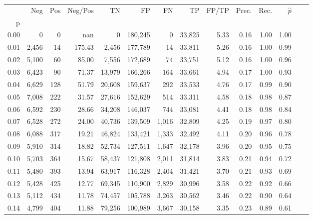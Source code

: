 \begin{tabular}{rrrrrrrrrrrrrr}
\toprule
{} &    Neg &  Pos & Neg/Pos &       TN &       FP &      FN &      TP & FP/TP & Prec. &  Rec. & $\hat{p}$ \\
p    &        &      &         &          &          &         &         &       &       &       &           \\
\midrule
0.00 &      0 &    0 &     nan &        0 &  180,245 &       0 &  33,825 &  5.33 &  0.16 &  1.00 &      1.00 \\
0.01 &  2,456 &   14 &  175.43 &    2,456 &  177,789 &      14 &  33,811 &  5.26 &  0.16 &  1.00 &      0.99 \\
0.02 &  5,100 &   60 &   85.00 &    7,556 &  172,689 &      74 &  33,751 &  5.12 &  0.16 &  1.00 &      0.96 \\
0.03 &  6,423 &   90 &   71.37 &   13,979 &  166,266 &     164 &  33,661 &  4.94 &  0.17 &  1.00 &      0.93 \\
0.04 &  6,629 &  128 &   51.79 &   20,608 &  159,637 &     292 &  33,533 &  4.76 &  0.17 &  0.99 &      0.90 \\
0.05 &  7,008 &  222 &   31.57 &   27,616 &  152,629 &     514 &  33,311 &  4.58 &  0.18 &  0.98 &      0.87 \\
0.06 &  6,592 &  230 &   28.66 &   34,208 &  146,037 &     744 &  33,081 &  4.41 &  0.18 &  0.98 &      0.84 \\
0.07 &  6,528 &  272 &   24.00 &   40,736 &  139,509 &   1,016 &  32,809 &  4.25 &  0.19 &  0.97 &      0.80 \\
0.08 &  6,088 &  317 &   19.21 &   46,824 &  133,421 &   1,333 &  32,492 &  4.11 &  0.20 &  0.96 &      0.78 \\
0.09 &  5,910 &  314 &   18.82 &   52,734 &  127,511 &   1,647 &  32,178 &  3.96 &  0.20 &  0.95 &      0.75 \\
0.10 &  5,703 &  364 &   15.67 &   58,437 &  121,808 &   2,011 &  31,814 &  3.83 &  0.21 &  0.94 &      0.72 \\
0.11 &  5,480 &  393 &   13.94 &   63,917 &  116,328 &   2,404 &  31,421 &  3.70 &  0.21 &  0.93 &      0.69 \\
0.12 &  5,428 &  425 &   12.77 &   69,345 &  110,900 &   2,829 &  30,996 &  3.58 &  0.22 &  0.92 &      0.66 \\
0.13 &  5,112 &  434 &   11.78 &   74,457 &  105,788 &   3,263 &  30,562 &  3.46 &  0.22 &  0.90 &      0.64 \\
0.14 &  4,799 &  404 &   11.88 &   79,256 &  100,989 &   3,667 &  30,158 &  3.35 &  0.23 &  0.89 &      0.61 \\

\end{tabular}
